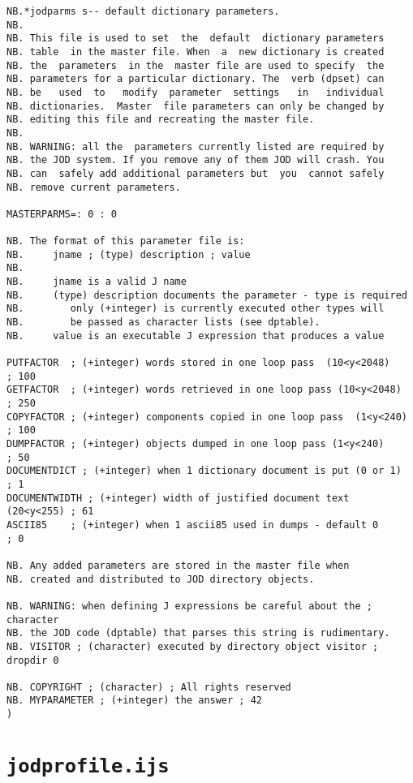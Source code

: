 \begin{lstlisting}[frame=single,framerule=0pt,basicstyle=\ttfamily\footnotesize]
NB.*jodparms s-- default dictionary parameters.
NB.
NB. This file is used to set  the  default  dictionary parameters
NB. table  in the master file. When  a  new dictionary is created
NB. the  parameters  in the  master file are used to specify  the
NB. parameters for a particular dictionary. The  verb (dpset) can
NB. be   used  to   modify  parameter  settings   in   individual
NB. dictionaries.  Master  file parameters can only be changed by
NB. editing this file and recreating the master file.
NB.
NB. WARNING: all the  parameters currently listed are required by
NB. the JOD system. If you remove any of them JOD will crash. You
NB. can  safely add additional parameters but  you  cannot safely
NB. remove current parameters.

MASTERPARMS=: 0 : 0

NB. The format of this parameter file is:
NB.     jname ; (type) description ; value
NB. 
NB.     jname is a valid J name
NB.     (type) description documents the parameter - type is required
NB.        only (+integer) is currently executed other types will
NB.        be passed as character lists (see dptable).
NB.     value is an executable J expression that produces a value
  
PUTFACTOR  ; (+integer) words stored in one loop pass  (10<y<2048)      ; 100
GETFACTOR  ; (+integer) words retrieved in one loop pass (10<y<2048)    ; 250
COPYFACTOR ; (+integer) components copied in one loop pass  (1<y<240)   ; 100
DUMPFACTOR ; (+integer) objects dumped in one loop pass (1<y<240)       ; 50
DOCUMENTDICT ; (+integer) when 1 dictionary document is put (0 or 1)    ; 1
DOCUMENTWIDTH ; (+integer) width of justified document text  (20<y<255) ; 61
ASCII85    ; (+integer) when 1 ascii85 used in dumps - default 0        ; 0

NB. Any added parameters are stored in the master file when
NB. created and distributed to JOD directory objects.  

NB. WARNING: when defining J expressions be careful about the ; character 
NB. the JOD code (dptable) that parses this string is rudimentary.
NB. VISITOR ; (character) executed by directory object visitor ; dropdir 0

NB. COPYRIGHT ; (character) ; All rights reserved
NB. MYPARAMETER ; (+integer) the answer ; 42
)
\end{lstlisting}


   \newpage
   \section{\texttt{jodprofile.ijs}}\label{ap:jodprofile}
   
